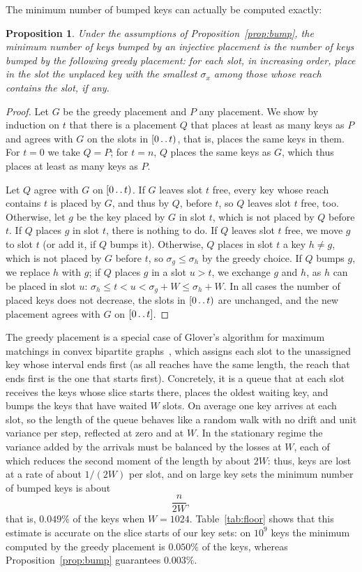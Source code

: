 \documentclass[11pt]{article}
\def\..{\,\mathpunct{\ldotp\ldotp}} %
\newtheorem{proposition}{Proposition}
\begin{document}
The minimum number of bumped keys can actually be computed exactly:

\begin{proposition}
\label{prop:greedy}
Under the assumptions of Proposition~\ref{prop:bump}, the minimum number of
keys bumped by an injective placement is the number of keys bumped by the
following greedy placement: for each slot, in increasing order, place in the
slot the unplaced key with the smallest $\sigma_x$ among those whose
reach contains the slot, if any.
\end{proposition}

\begin{proof}
Let $G$ be the greedy placement and $P$ any placement. We show by induction
on $t$ that there is a placement $Q$ that places at least as many keys as $P$
and agrees with $G$ on the slots in $[0\..t)$, that is, places the same keys
in them. For $t=0$ we take $Q=P$; for $t=n$, $Q$ places the same keys as
$G$, which thus places at least as many keys as $P$.

Let $Q$ agree with $G$ on $[0\..t)$. If $G$ leaves slot $t$ free, every key
whose reach contains $t$ is placed by $G$, and thus by $Q$, before $t$, so
$Q$ leaves slot $t$ free, too. Otherwise, let $g$ be the key placed by $G$ in
slot $t$, which is not placed by $Q$ before $t$. If $Q$ places $g$ in slot
$t$, there is nothing to do. If $Q$ leaves slot $t$ free, we move $g$ to
slot $t$ (or add it, if $Q$ bumps it). Otherwise, $Q$ places in slot $t$ a
key $h\neq g$, which is not placed by $G$ before $t$, so $\sigma_g\leq\sigma_h$
by the greedy choice. If $Q$ bumps $g$, we replace $h$ with $g$; if $Q$
places $g$ in a slot $u>t$, we exchange $g$ and $h$, as $h$ can be placed
in slot $u$: $\sigma_h\leq t<u<\sigma_g+W\leq\sigma_h+W$. In all cases the
number of placed keys does not decrease, the slots in $[0\..t)$ are
unchanged, and the new placement agrees with $G$ on $[0\..t]$.
\end{proof}

The greedy placement is a special case of Glover's algorithm for maximum
matchings in convex bipartite graphs~\cite{GloMMCBG}, which assigns each
slot to the unassigned key whose interval ends first (as all reaches have
the same length, the reach that ends first is the one that starts first).
Concretely, it is a queue that at each slot receives the keys whose slice
starts there, places the oldest waiting key, and bumps the keys that have
waited $W$ slots. On average one key arrives at each slot, so the length
of the queue behaves like a random walk with no drift and unit variance per
step, reflected at zero and at $W$. In the stationary regime the variance
added by the arrivals must be balanced by the losses at $W$, each of which
reduces the second moment of the length by about $2W$: thus, keys are lost at
a rate of about $1/(2W)$ per slot, and on large key sets the minimum number
of bumped keys is about
\[
\frac n{2W},
\]
that is, $0.049\%$ of the keys when $W=1024$. Table~\ref{tab:floor} shows
that this estimate is accurate on the slice starts of our key sets: on
$10^9$ keys the minimum computed by the greedy placement is $0.050\%$ of the
keys, whereas Proposition~\ref{prop:bump} guarantees $0.003\%$.
\end{document}

